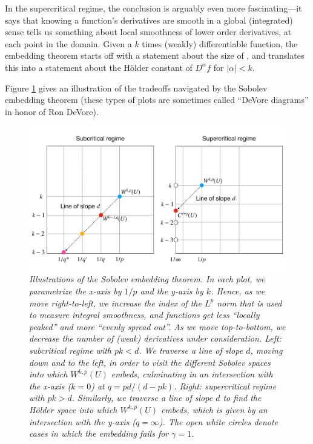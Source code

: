 \documentclass{article}
\begin{document}
In the supercritical regime, the conclusion is arguably even more
fascinating---it says that knowing a function's derivatives are smooth in a
global (integrated) sense tells us something about local smoothness of lower
order derivatives, at each point in the domain. Given a $k$ times (weakly)
differentiable function, the embedding theorem starts off with a statement about
the size of , and
translates this into a statement about the H{\"o}lder constant of $D^\alpha f$
for $|\alpha| < k$.      

Figure \ref{fig:sobolev} gives an illustration of the tradeoffs navigated by the
Sobolev embedding theorem (these types of plots are sometimes called ``DeVore
diagrams'' in honor of Ron DeVore).   

\begin{figure}[tb]
\centering
\includegraphics[width=\textwidth]{sobolev.pdf}
\caption{\it Illustrations of the Sobolev embedding theorem. In each plot, we 
  parametrize the x-axis by $1/p$ and the y-axis by $k$. Hence, as we move
  right-to-left, we increase the index of the $L^p$ norm that is used to measure 
  integral smoothness, and functions get less ``locally peaked'' and more 
  ``evenly spread out''. As we move top-to-bottom, we decrease the number of
  (weak) derivatives under consideration. Left: subcritical regime with $pk <
  d$. We traverse a line of slope $d$, moving down and to the left, in order to
  visit the different Sobolev spaces into which $W^{k,p}(U)$ embeds, culminating
  in an intersection with the x-axis ($k=0$) at $q = pd/(d-pk)$. Right:
  supercritical regime with $pk > d$. Similarly, we traverse a line of slope $d$
  to find the H{\"o}lder space into which $W^{k,p}(U)$ embeds, which is given by
  an intersection with the y-axis ($q = \infty$). The open white circles denote
  cases in which the embedding fails for $\gamma = 1$.}  
\label{fig:sobolev}
\end{figure}
\end{document}
